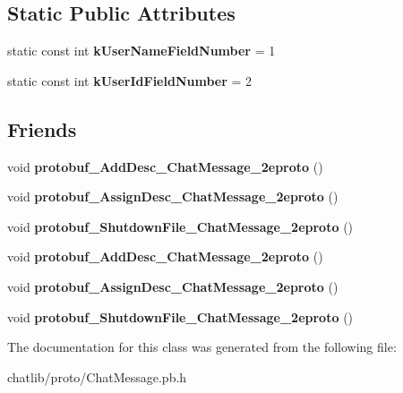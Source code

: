 \subsection*{Static Public Attributes}
\begin{DoxyCompactItemize}
\item 
\hypertarget{classSimpleChat_1_1ChatTarget_a1ab7dc5d077b8b447dec63fef8dd08b3}{static const int {\bfseries k\-User\-Name\-Field\-Number} = 1}\label{classSimpleChat_1_1ChatTarget_a1ab7dc5d077b8b447dec63fef8dd08b3}

\item 
\hypertarget{classSimpleChat_1_1ChatTarget_a9bfaf7a0f8b951b2f968a804f7b2c179}{static const int {\bfseries k\-User\-Id\-Field\-Number} = 2}\label{classSimpleChat_1_1ChatTarget_a9bfaf7a0f8b951b2f968a804f7b2c179}

\end{DoxyCompactItemize}
\subsection*{Friends}
\begin{DoxyCompactItemize}
\item 
\hypertarget{classSimpleChat_1_1ChatTarget_ab0d9593aa41361f04ab91f917ef9ec0e}{void {\bfseries protobuf\-\_\-\-Add\-Desc\-\_\-\-Chat\-Message\-\_\-2eproto} ()}\label{classSimpleChat_1_1ChatTarget_ab0d9593aa41361f04ab91f917ef9ec0e}

\item 
\hypertarget{classSimpleChat_1_1ChatTarget_a4ca7b2c64786782406ca69f6ba39ccb2}{void {\bfseries protobuf\-\_\-\-Assign\-Desc\-\_\-\-Chat\-Message\-\_\-2eproto} ()}\label{classSimpleChat_1_1ChatTarget_a4ca7b2c64786782406ca69f6ba39ccb2}

\item 
\hypertarget{classSimpleChat_1_1ChatTarget_a78726b79d52a130a50d7670a5c0238fc}{void {\bfseries protobuf\-\_\-\-Shutdown\-File\-\_\-\-Chat\-Message\-\_\-2eproto} ()}\label{classSimpleChat_1_1ChatTarget_a78726b79d52a130a50d7670a5c0238fc}

\item 
\hypertarget{classSimpleChat_1_1ChatTarget_ab0d9593aa41361f04ab91f917ef9ec0e}{void {\bfseries protobuf\-\_\-\-Add\-Desc\-\_\-\-Chat\-Message\-\_\-2eproto} ()}\label{classSimpleChat_1_1ChatTarget_ab0d9593aa41361f04ab91f917ef9ec0e}

\item 
\hypertarget{classSimpleChat_1_1ChatTarget_a4ca7b2c64786782406ca69f6ba39ccb2}{void {\bfseries protobuf\-\_\-\-Assign\-Desc\-\_\-\-Chat\-Message\-\_\-2eproto} ()}\label{classSimpleChat_1_1ChatTarget_a4ca7b2c64786782406ca69f6ba39ccb2}

\item 
\hypertarget{classSimpleChat_1_1ChatTarget_a78726b79d52a130a50d7670a5c0238fc}{void {\bfseries protobuf\-\_\-\-Shutdown\-File\-\_\-\-Chat\-Message\-\_\-2eproto} ()}\label{classSimpleChat_1_1ChatTarget_a78726b79d52a130a50d7670a5c0238fc}

\end{DoxyCompactItemize}


The documentation for this class was generated from the following file\-:\begin{DoxyCompactItemize}
\item 
chatlib/proto/Chat\-Message.\-pb.\-h\end{DoxyCompactItemize}
